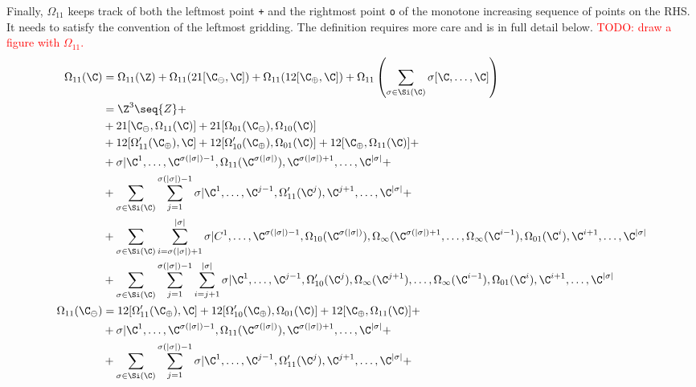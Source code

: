 Finally, $\Omega_{11}$ keeps track of both the leftmost point \texttt{+} and the rightmost point \texttt{o} of the monotone increasing sequence of points on the RHS. It needs to satisfy the convention of the leftmost gridding. The definition requires more care and is in full detail below.
\textcolor{red}{TODO: draw a figure with $\Omega_{11}$.} 
\begin{align}
  \Omega_{11}(\C)   &= \Omega_{11}(\Z) + \Omega_{11}(21[\C_\ominus,\C]) + \Omega_{11}(12[\C_\oplus, \C]) + \Omega_{11}\left(\sum_{\sigma \in \Si(\C)}\sigma[\C,\ldots,\C]\right)\notag\\
                    &= \Z^3\seq{Z}+\label{point11}\\
                     &+ 21[\C_\ominus,\Omega_{11}(\C)] + 21[\Omega_{01}(\C_\ominus),\Omega_{10}(\C)]\label{21juxt}\\
                     &+ 12[\Omega'_{11}(\C_\oplus),\C] + 12[\Omega'_{10}(\C_\oplus),\Omega_{01}(\C)] + 12[\C_\oplus, \Omega_{11}(\C)] +\label{12juxt}\\
                    &+ \sigma\vert{\C^{1},\ldots,\C^{\sigma(|\sigma|)-1},\Omega_{11}(\C^{\sigma(|\sigma|)}),\C^{\sigma(|\sigma|)+1},\ldots,\C^{|\sigma|}} +\label{rightmostjuxt}\\
                    &+ \sum_{\sigma \in \Si(\C)}\sum_{j=1}^{\sigma(|\sigma|)-1}\sigma\vert{\C^{1},\ldots,\C^{j-1},\Omega'_{11}(\C^{j}),\C^{j+1},\ldots,\C^{|\sigma|}} +\label{belowrightmostjuxt}\\
                    &+\sum_{\sigma \in \Si(\C)}\sum_{i=\sigma(|\sigma|)+1}^{|\sigma|}\sigma\vert{C^1,\ldots,\C^{\sigma(|\sigma|)-1},\Omega_{10}(\C^{\sigma(|\sigma|)}), \Omega_\infty(\C^{\sigma(|\sigma|)+1},\ldots,\Omega_\infty(\C^{i-1}),\Omega_{01}(\C^i),\C^{i+1},\ldots,\C^{|\sigma|}}\label{firstlongline}\\
                    &+\sum_{\sigma \in \Si(\C)}\sum_{j=1}^{\sigma(|\sigma|)-1}\sum_{i=j+1}^{|\sigma|}\sigma\vert{\C^1,\ldots,\C^{j-1},\Omega'_{10}(\C^j),\Omega_\infty(\C^{j+1}),\ldots,\Omega_\infty(\C^{i-1}),\Omega_{01}(\C^i),\C^{i+1},\ldots,\C^{|\sigma|}}\label{secondlongline}\\
  \Omega_{11}(\C_\ominus) &= 12[\Omega'_{11}(\C_\oplus),\C] + 12[\Omega'_{10}(\C_\oplus),\Omega_{01}(\C)] + 12[\C_\oplus, \Omega_{11}(\C)] +\notag\\
                      &+ \sigma\vert{\C^{1},\ldots,\C^{\sigma(|\sigma|)-1},\Omega_{11}(\C^{\sigma(|\sigma|)}),\C^{\sigma(|\sigma|)+1},\ldots,\C^{|\sigma|}} +\notag\\
                    &+ \sum_{\sigma \in \Si(\C)}\sum_{j=1}^{\sigma(|\sigma|)-1}\sigma\vert{\C^{1},\ldots,\C^{j-1},\Omega'_{11}(\C^{j}),\C^{j+1},\ldots,\C^{|\sigma|}} +\notag\\

\end{align}
